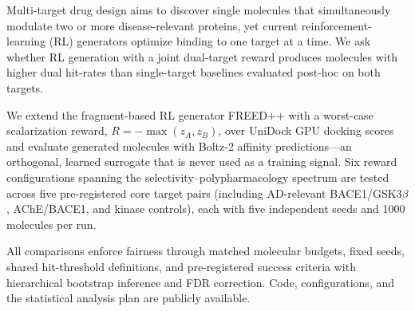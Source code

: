 Multi-target drug design aims to discover single molecules that simultaneously
modulate two or more disease-relevant proteins, yet current reinforcement-learning
(RL) generators optimize binding to one target at a time.  We ask whether
RL generation with a joint dual-target reward produces molecules with higher
dual hit-rates than single-target baselines evaluated post-hoc on both targets.

We extend the fragment-based RL generator FREED++ with a worst-case
scalarization reward, $R = -\max(z_A, z_B)$, over UniDock GPU docking
scores and evaluate generated molecules with Boltz-2 affinity
predictions---an orthogonal, learned surrogate that is never used as a
training signal.  Six reward configurations spanning the selectivity--polypharmacology
spectrum are tested across five pre-registered core target pairs (including
AD-relevant BACE1/GSK3$\beta$, AChE/BACE1, and kinase controls), each with
five independent seeds and 1000 molecules per run.


All comparisons enforce fairness through matched molecular budgets, fixed seeds,
shared hit-threshold definitions, and pre-registered success criteria
with hierarchical bootstrap inference and FDR correction.
Code, configurations, and the statistical analysis plan are publicly available.
